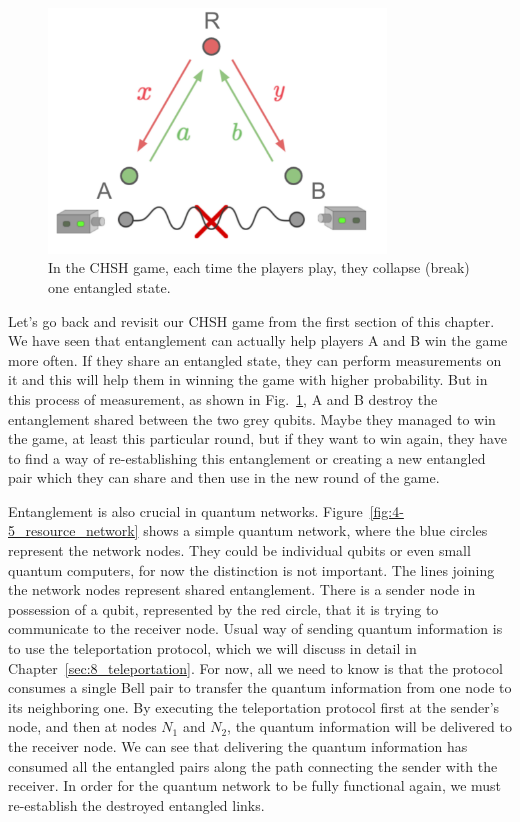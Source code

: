 \begin{figure}[H]
   \centering
    \includegraphics[width=0.8\textwidth]{lesson4/CHSH_broken_entanglement.pdf}
    
        \caption{In the CHSH game, each time the players play, they collapse (break) one entangled state.}
    
    \label{fig:chsh-broken}
\end{figure}


Let's go back and revisit our CHSH game from the first section of this chapter. We have seen that entanglement can actually help players A and B win the game more often. If they share an entangled state, they can perform measurements on it and this will help them in winning the game with higher probability. But in this process of measurement, as shown in Fig.~\ref{fig:chsh-broken}, A and B destroy the entanglement shared between the two grey qubits.  Maybe they managed to win the game, at least this particular round, but if they want to win again, they have to find a way of re-establishing this entanglement or creating a new entangled pair which they can share and then use in the new round of the game. 

Entanglement is also crucial in quantum networks.
Figure~\ref{fig:4-5_resource_network} shows a simple quantum network, where the blue circles represent the network nodes.
They could be individual qubits or even small quantum computers, for now the distinction is not important.
The lines joining the network nodes represent shared entanglement.
There is a sender node in possession of a qubit, represented by the red circle, that it is trying to communicate to the receiver node.
Usual way of sending quantum information is to use the teleportation protocol, which we will discuss in detail in Chapter~\ref{sec:8_teleportation}.
For now, all we need to know is that the protocol consumes a single Bell pair to transfer the quantum information from one node to its neighboring one.
By executing the teleportation protocol first at the sender's node, and then at nodes $N_1$ and $N_2$, the quantum information will be delivered to the receiver node.
We can see that delivering the quantum information has consumed all the entangled pairs along the path connecting the sender with the receiver.
In order for the quantum network to be fully functional again, we must re-establish the destroyed entangled links.

